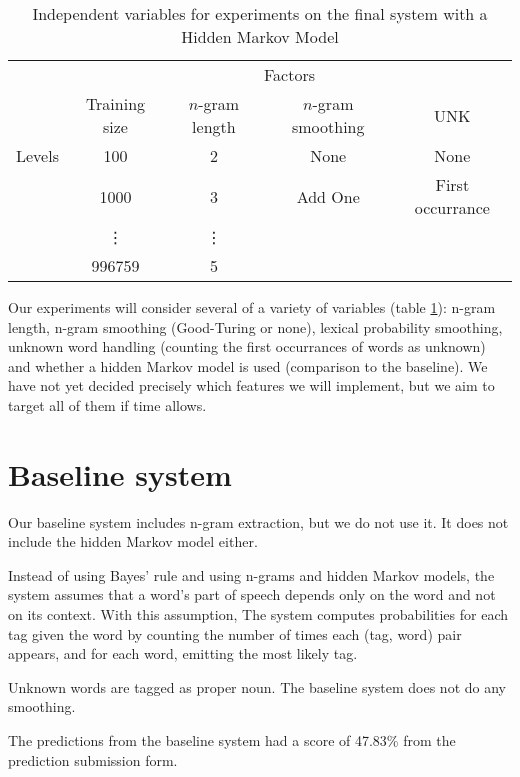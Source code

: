 \documentclass{article}
\begin{document}
\begin{table}
\begin{tabular}{lcccc}
& \multicolumn{4}{c}{Factors} \\
\cmidrule{2-5}
       & Training size & $n$-gram length & $n$-gram smoothing & UNK\\
\cmidrule{2-5}
Levels & 100     &  2  & None    & None \\
       & 1000    &  3  & Add One & First occurrance  \\
       & \vdots  &  \vdots  &     &      &      \\
       & 996759  &  5  &     &      &      \\
\cmidrule{2-5}
\end{tabular}
\caption{\label{tab:ind_vars}Independent variables for experiments on the final system with a Hidden Markov Model}
\end{table}

Our experiments will consider several of a variety of variables (table \ref{tab:ind_vars}): n-gram length,
n-gram smoothing (Good-Turing or none), lexical probability smoothing, unknown
word handling (counting the first occurrances of words as unknown) and
whether a hidden Markov model is used (comparison to the baseline).
We have not yet decided precisely which features we will implement, but we
aim to target all of them if time allows.

\section{Baseline system}
Our baseline system includes n-gram extraction,
but we do not use it.
It does not include the hidden Markov model either.

Instead of using Bayes' rule and using n-grams and hidden Markov models,
the system assumes that a word's part of speech depends only
on the word and not on its context. With this assumption,
The system computes probabilities for each tag given the word by counting the
number of times each (tag, word) pair appears, and for each word, emitting the
most likely tag.

Unknown words are tagged as proper noun.
The baseline system does not do any smoothing.

The predictions from the baseline system had a score of 47.83\%
from the prediction submission form.
\end{document}
